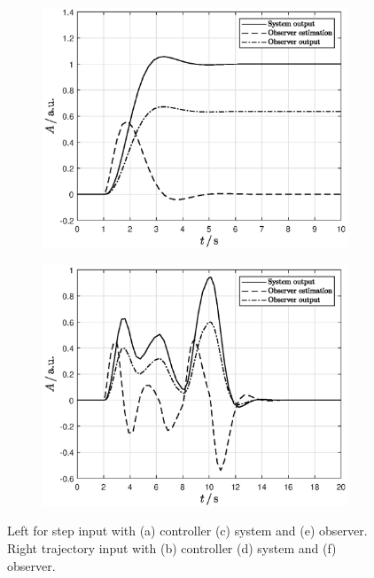 \begin{figure}[ht]
    \begin{subfigure}[b]{0.45\textwidth}
    \includegraphics[width=\textwidth]{simulink/simulinkPlotStepObserver.eps}
    \caption{}
    \label{subfig:stepObserver}
    \end{subfigure}
    \begin{subfigure}[b]{0.45\textwidth}
    \includegraphics[width=\textwidth]{simulink/simulinkPlotTrajectoryObserver.eps}
    \caption{}
    \label{subfig:trajObserver}
    \end{subfigure}

    \hfill
    
    \caption[Simulations in Simulink]{Left for step input with (a) controller (c) system and (e) observer. Right trajectory input with (b) controller (d) system and (f) observer.}
    \label{fig:simulations}
\end{figure}
\FloatBarrier


